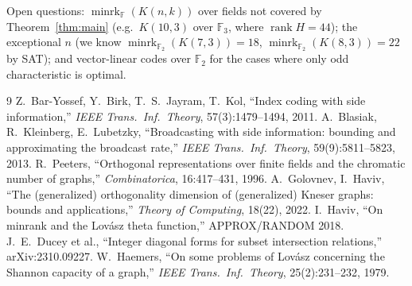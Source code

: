 \documentclass[conference]{IEEEtran}
\theoremstyle{remark}
\newcommand{\F}{\mathbb{F}}
\newcommand{\minrk}{\operatorname{minrk}}
\newcommand{\rank}{\operatorname{rank}}
\begin{document}
Open questions: $\minrk_{\F}(K(n,k))$ over fields not covered by Theorem~\ref{thm:main} (e.g.\ $K(10,3)$ over $\F_3$, where
$\rank H=44$); the exceptional $n$ (we know $\minrk_{\F_2}(K(7,3))=18$, $\minrk_{\F_2}(K(8,3))=22$ by SAT); and vector-linear
codes over $\F_2$ for the cases where only odd characteristic is optimal.

\begin{thebibliography}{9}
 Z.~Bar-Yossef, Y.~Birk, T.~S.~Jayram, T.~Kol, ``Index coding with side information,'' \emph{IEEE Trans.\ Inf.\ Theory}, 57(3):1479--1494, 2011.
 A.~Blasiak, R.~Kleinberg, E.~Lubetzky, ``Broadcasting with side information: bounding and approximating the broadcast rate,'' \emph{IEEE Trans.\ Inf.\ Theory}, 59(9):5811--5823, 2013.
 R.~Peeters, ``Orthogonal representations over finite fields and the chromatic number of graphs,'' \emph{Combinatorica}, 16:417--431, 1996.
 A.~Golovnev, I.~Haviv, ``The (generalized) orthogonality dimension of (generalized) Kneser graphs: bounds and applications,'' \emph{Theory of Computing}, 18(22), 2022.
 I.~Haviv, ``On minrank and the Lov\'asz theta function,'' APPROX/RANDOM 2018.
 J.~E.~Ducey et al., ``Integer diagonal forms for subset intersection relations,'' arXiv:2310.09227.
 W.~Haemers, ``On some problems of Lov\'asz concerning the Shannon capacity of a graph,'' \emph{IEEE Trans.\ Inf.\ Theory}, 25(2):231--232, 1979.
\end{thebibliography}
\end{document}
